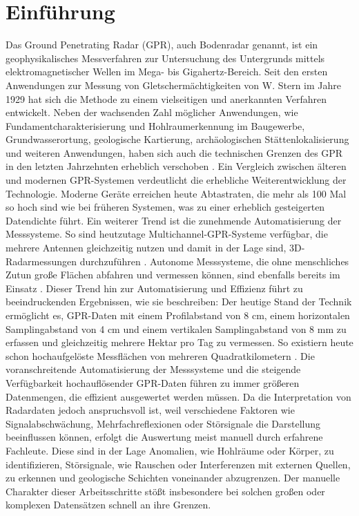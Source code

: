 \section{Einführung}

Das Ground Penetrating Radar (GPR), auch Bodenradar genannt, ist ein geophysikalisches Messverfahren zur Untersuchung des Untergrunds mittels elektromagnetischer Wellen im Mega- bis Gigahertz-Bereich. Seit den ersten Anwendungen zur Messung von Gletschermächtigkeiten von W. Stern im Jahre 1929 \parencite{knodel_ground_2007} hat sich die Methode zu einem vielseitigen und anerkannten Verfahren entwickelt. Neben der wachsenden Zahl möglicher Anwendungen, wie Fundamentcharakterisierung und Hohlraumerkennung im Baugewerbe, Grundwasserortung, geologische Kartierung, archäologischen Stättenlokalisierung und weiteren Anwendungen, haben sich auch die technischen Grenzen des GPR in den letzten Jahrzehnten erheblich verschoben \parencites{annan_near-surface_2005}{geophysical_survey_systems_inc_gssis_2020}. Ein Vergleich zwischen älteren \parencite{johnson_application_1982} und modernen GPR-Systemen \parencite{geophysical_survey_systems_inc_200_2025} verdeutlicht die erhebliche Weiterentwicklung der Technologie. Moderne Geräte erreichen heute Abtastraten, die mehr als 100 Mal so hoch sind wie bei früheren Systemen, was zu einer erheblich gesteigerten Datendichte führt. Ein weiterer Trend ist die zunehmende Automatisierung der Messsysteme. So sind heutzutage Multichannel-GPR-Systeme verfügbar, die mehrere Antennen gleichzeitig nutzen und damit in der Lage sind, 3D-Radarmessungen durchzuführen \parencite{goodman_multi-channel_2013}. Autonome Messsysteme, die ohne menschliches Zutun große Flächen abfahren und vermessen können, sind ebenfalls bereits im Einsatz \parencite{kouros_3d_2018}. Dieser Trend hin zur Automatisierung und Effizienz führt zu beeindruckenden Ergebnissen, wie sie \textcite{trinks_extensive_2017} beschreiben: Der heutige Stand der Technik ermöglicht es, GPR-Daten mit einem Profilabstand von 8 cm, einem horizontalen Samplingabstand von 4 cm und einem vertikalen Samplingabstand von 8 mm zu erfassen und gleichzeitig mehrere Hektar pro Tag zu vermessen. So existiern heute schon hochaufgelöste Messflächen von mehreren Quadratkilometern \parencite{trinks_extensive_2017}. Die voranschreitende Automatisierung der Messsysteme und die steigende Verfügbarkeit hochauflösender GPR-Daten führen zu immer größeren Datenmengen, die effizient ausgewertet werden müssen. Da die Interpretation von Radardaten jedoch anspruchsvoll ist, weil verschiedene Faktoren wie Signalabschwächung, Mehrfachreflexionen oder Störsignale die Darstellung beeinflussen können, erfolgt die Auswertung meist manuell durch erfahrene Fachleute. Diese sind in der Lage Anomalien, wie Hohlräume oder Körper, zu identifizieren, Störsignale, wie Rauschen oder Interferenzen mit externen Quellen, zu erkennen und geologische Schichten voneinander abzugrenzen. Der manuelle Charakter dieser Arbeitsschritte stößt insbesondere bei solchen großen oder komplexen Datensätzen schnell an ihre Grenzen. \\

